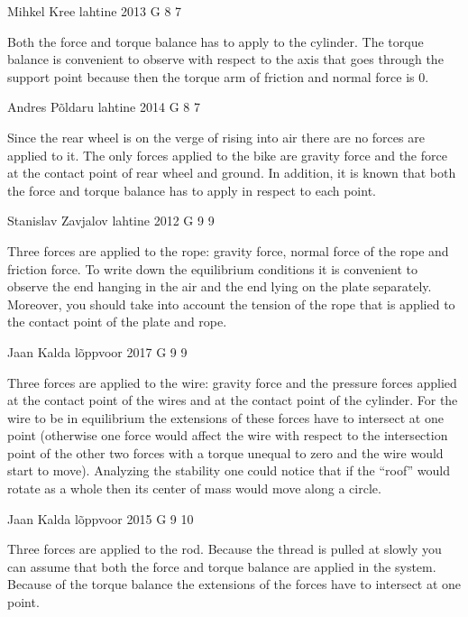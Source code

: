 \documentclass[11pt]{article}
\begin{document}
{Mihkel Kree} %
{lahtine} %
{2013} %
{G 8} %
{7} %
{

\ifEngHint
Both the force and torque balance has to apply to the cylinder. The torque balance is convenient to observe with respect to the axis that goes through the support point because then the torque arm of friction and normal force is 0.
\fi
}

{Andres Põldaru} %
{lahtine} %
{2014} %
{G 8} %
{7} %
{

\ifEngHint
Since the rear wheel is on the verge of rising into air there are no forces are applied to it. The only forces applied to the bike are gravity force and the force at the contact point of rear wheel and ground. In addition, it is known that both the force and torque balance has to apply in respect to each point.
\fi
}

{Stanislav Zavjalov} %
{lahtine} %
{2012} %
{G 9} %
{9} %
{

\ifEngHint
Three forces are applied to the rope: gravity force, normal force of the rope and friction force. To write down the equilibrium conditions it is convenient to observe the end hanging in the air and the end lying on the plate separately.  Moreover, you should take into account the tension of the rope that is applied to the contact point of the plate and rope.
\fi
}

{Jaan Kalda} %
{lõppvoor} %
{2017} %
{G 9} %
{9} %
{

\ifEngHint
Three forces are applied to the wire: gravity force and the pressure forces applied at the contact point of the wires and at the contact point of the cylinder. For the wire to be in equilibrium the extensions of these forces have to intersect at one point (otherwise one force would affect the wire with respect to the intersection point of the other two forces with a torque unequal to zero and the wire would start to move). Analyzing the stability one could notice that if the “roof” would rotate as a whole then its center of mass would move along a circle.
\fi
}

{Jaan Kalda} %
{lõppvoor} %
{2015} %
{G 9} %
{10} %
{

\ifEngHint
Three forces are applied to the rod. Because the thread is pulled at slowly you can assume that both the force and torque balance are applied in the system. Because of the torque balance the extensions of the forces have to intersect at one point.
\fi
}
\end{document}
